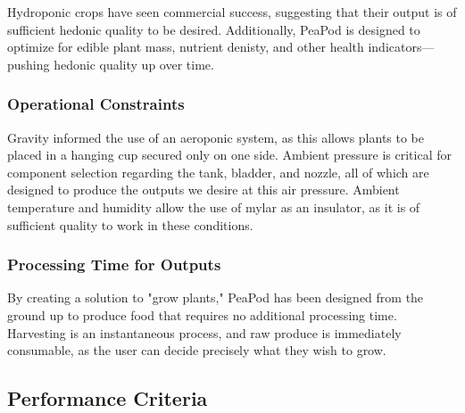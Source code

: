 \documentclass{report}
\begin{document}



Hydroponic crops have seen commercial success, suggesting that their output is of sufficient hedonic quality to be desired. Additionally, PeaPod is designed to optimize for edible plant mass, nutrient denisty, and other health indicators---pushing hedonic quality up over time.

\subsubsection{Operational Constraints} 
\label{sec:constraints-operational}


Gravity informed the use of an aeroponic system, as this allows plants to be placed in a hanging cup secured only on one side. Ambient pressure is critical for component selection regarding the tank, bladder, and nozzle, all of which are designed to produce the outputs we desire at this air pressure. Ambient temperature and humidity allow the use of mylar as an insulator, as it is of sufficient quality to work in these conditions.

\subsubsection{Processing Time for Outputs} 
\label{sec:constraints-processing}


By creating a solution to "grow plants," PeaPod has been designed from the ground up to produce food that requires no additional processing time. Harvesting is an instantaneous process, and raw produce is immediately consumable, as the user can decide precisely what they wish to grow.

\subsection{Performance Criteria}
\end{document}
